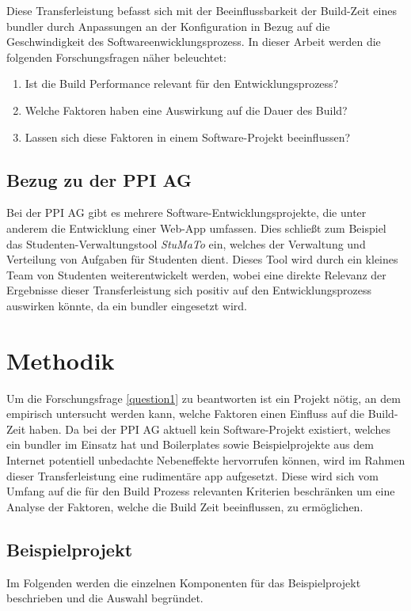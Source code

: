 \documentclass[11pt]{report}
\begin{document}
    	Diese Transferleistung befasst sich mit der Beeinflussbarkeit der Build-Zeit eines \Gls{bundler} durch Anpassungen an der Konfiguration in Bezug auf die Geschwindigkeit des Softwareenwicklungsprozess. In dieser Arbeit werden die folgenden Forschungsfragen näher beleuchtet:
	    	\begin{enumerate}
		    	\item Ist die Build Performance relevant für den Entwicklungsprozess? \label{question0}
		    	\item Welche Faktoren haben eine Auswirkung auf die Dauer des Build? \label{question1}
		    	\item Lassen sich diese Faktoren in einem Software-Projekt beeinflussen? \label{question2}
		    \end{enumerate}

		\section{Bezug zu der PPI AG}
			Bei der PPI AG gibt es mehrere Software-Entwicklungsprojekte, die unter anderem die Entwicklung einer Web-App umfassen. Dies schließt zum Beispiel das Studenten-Verwaltungstool \emph{StuMaTo} ein, welches der Verwaltung und Verteilung von Aufgaben für Studenten dient. Dieses Tool wird durch ein kleines Team von Studenten weiterentwickelt werden, wobei eine direkte Relevanz der Ergebnisse dieser Transferleistung sich positiv auf den Entwicklungsprozess auswirken könnte, da ein \Gls{bundler} eingesetzt wird.

	\chapter{Methodik}
		\label{section:method}
		Um die Forschungsfrage \ref{question1} zu beantworten ist ein Projekt nötig, an dem empirisch untersucht werden kann, welche Faktoren einen Einfluss auf die Build-Zeit haben. Da bei der PPI AG aktuell kein Software-Projekt existiert, welches ein \Gls{bundler} im Einsatz hat und Boilerplates sowie Beispielprojekte aus dem Internet potentiell unbedachte Nebeneffekte hervorrufen können, wird im Rahmen dieser Transferleistung eine rudimentäre \Gls{app} aufgesetzt. Diese wird sich vom Umfang auf die für den Build Prozess relevanten Kriterien beschränken um eine Analyse der Faktoren, welche die Build Zeit beeinflussen, zu ermöglichen.
		\section{Beispielprojekt}
			Im Folgenden werden die einzelnen Komponenten für das Beispielprojekt beschrieben und die Auswahl begründet.
\end{document}
